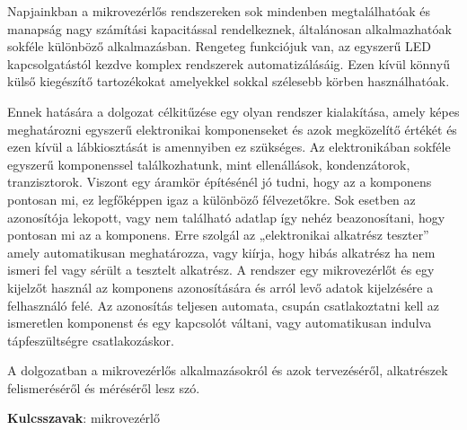 Napjainkban a mikrovezérlős rendszereken sok mindenben megtalálhatóak és
manapság nagy számítási kapacitással rendelkeznek, általánosan
alkalmazhatóak sokféle különböző alkalmazásban. Rengeteg funkciójuk van,
az egyszerű LED kapcsolgatástól kezdve komplex rendszerek automatizálásáig.
Ezen kívül könnyű külső kiegészítő tartozékokat amelyekkel sokkal
szélesebb körben használhatóak.

Ennek hatására a dolgozat célkitűzése egy olyan rendszer kialakítása,
amely képes meghatározni egyszerű elektronikai komponenseket és azok
megközelítő értékét és ezen kívül a lábkiosztását is amennyiben ez
szükséges. Az elektronikában sokféle egyszerű komponenssel találkozhatunk,
mint ellenállások, kondenzátorok, tranzisztorok. Viszont egy áramkör
építésénél jó tudni, hogy az a komponens pontosan mi, ez legfőképpen
igaz a különböző félvezetőkre. Sok esetben az azonosítója lekopott,
vagy nem található adatlap így nehéz beazonosítani, hogy pontosan mi
az a komponens. Erre szolgál az „elektronikai alkatrész teszter” amely
automatikusan meghatározza, vagy kiírja, hogy hibás alkatrész ha nem
ismeri fel vagy sérült a tesztelt alkatrész. A rendszer egy mikrovezérlőt
és egy kijelzőt használ az komponens azonosítására és arról levő adatok
kijelzésére a felhasználó felé. Az azonosítás teljesen automata,
csupán csatlakoztatni kell az ismeretlen komponenst és egy kapcsolót
váltani, vagy automatikusan indulva tápfeszültségre csatlakozáskor.

A dolgozatban a mikrovezérlős alkalmazásokról és azok tervezéséről,
alkatrészek felismeréséről és méréséről lesz szó.

\textbf{Kulcsszavak}: mikrovezérlő